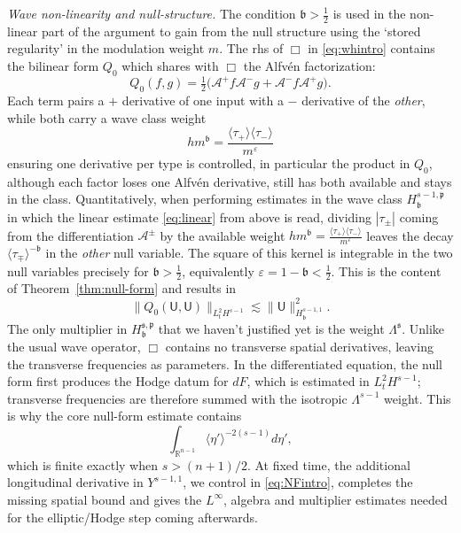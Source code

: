 \documentclass[11pt,reqno]{amsart}
\theoremstyle{plain}
\theoremstyle{definition}
\theoremstyle{remark}
\numberwithin{equation}{section}
\newcommand{\breg}{\mathfrak b}
\newcommand{\sreg}{\mathfrak s}
\newcommand{\preg}{\mathfrak p}
\newcommand{\Ufield}{\mathsf U}
\newcommand{\Real}{\mathbb R}
\begin{document}
\textit{Wave non-linearity and null-structure.} The condition $\breg>\frac12$ is used in the non-linear part of the argument to gain from the null structure using the `stored regularity' in the modulation weight $m$. The rhs of $\Box$ in \eqref{eq:whintro} contains the bilinear form $Q_0$ which shares with $\Box$ the Alfv\'en factorization:
\[
 Q_0(f,g)=\tfrac12\big(\mathcal A^+f \mathcal A^-g
                         +\mathcal A^-f \mathcal A^+g\big).
\]
Each term pairs a $+$ derivative
of one input with a $-$ derivative of the \emph{other}, while both carry a wave class weight
\[
    hm^{\breg}=\frac{\langle\tau_+\rangle\langle\tau_-\rangle}{m^{\varepsilon}}
\]
ensuring one derivative per type is controlled, in particular the product in $Q_0$, although each factor loses one Alfv\'en derivative, still has both available and stays in the class. Quantitatively, when performing estimates in the wave class $H_{\breg}^{s-1,\preg}$ in which the linear estimate \eqref{eq:linear} from above is read,  dividing $|\tau_\pm|$ coming from the differentiation $\mathcal{A}^\pm$ by
the available weight $hm^{\breg}=\frac{\langle\tau_+\rangle\langle\tau_-\rangle}{m^{\varepsilon}}$ leaves the decay $\langle\tau_\mp\rangle^{-\breg}$
in the \emph{other} null variable. The square of this kernel is integrable in
the two null variables precisely for
$\breg>\frac12$, equivalently $\varepsilon=1-\breg<\frac12$. This is the content of Theorem~\ref{thm:null-form} and results in 
\begin{equation}\label{eq:NFintro}
    \|Q_0(\Ufield,\Ufield)\|_{L^2_tH^{s-1}}
 \lesssim \|\Ufield\|_{H_{\breg}^{s-1,1}}^2.
\end{equation}
The only multiplier in $H_{\breg}^{\sreg,\preg}$ that we haven't justified yet is the weight $\Lambda^\sreg$. Unlike the usual wave operator, $\Box$ contains no transverse spatial
derivatives, leaving the transverse frequencies as parameters.  In the differentiated equation, the null form first produces the Hodge datum for $dF$, which is estimated in $L^2_tH^{s-1}$; transverse frequencies are therefore summed with the isotropic
$\Lambda^{s-1}$ weight.  This is why the core null-form estimate contains
\[
 \int_{\Real^{n-1}}\langle\eta'\rangle^{-2(s-1)} d\eta',
\]
which is finite exactly when $s>(n+1)/2$.  At fixed time, the additional
longitudinal derivative in $Y^{s-1,1}$, we control in \eqref{eq:NFintro}, completes the missing spatial bound
and gives the $L^\infty$, algebra and multiplier estimates needed for the
elliptic/Hodge step coming afterwards.\\
\end{document}
